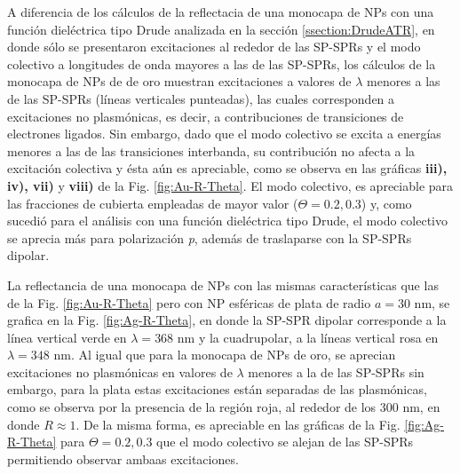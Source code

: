 A diferencia de los cálculos de la reflectacia de una monocapa de NPs  con una función dieléctrica tipo Drude analizada en la sección \ref{ssection:DrudeATR}, en donde sólo se presentaron excitaciones al rededor de las SP-SPRs y el modo colectivo a longitudes de onda mayores a las de las SP-SPRs, los cálculos de la monocapa de NPs de de oro muestran excitaciones a valores de $\lambda$ menores a las de las SP-SPRs (líneas verticales punteadas), las cuales corresponden a excitaciones no plasmónicas, es decir, a contribuciones de transiciones de electrones ligados. Sin embargo, dado que el modo colectivo se excita a energías menores a las de las transiciones interbanda, su contribución no afecta a la excitación colectiva y ésta aún es apreciable, como se observa en las gráficas \textbf{iii), iv), vii)} y \textbf{viii)} de la Fig. \ref{fig:Au-R-Theta}. El modo colectivo, es apreciable para las fracciones de cubierta empleadas de mayor valor ($\Theta = 0.2, 0.3$) y, como sucedió para el análisis con una función dieléctrica tipo Drude, el modo colectivo se aprecia más para polarización \emph{p}, además de traslaparse con la SP-SPRs dipolar.

La reflectancia de una monocapa de NPs con las mismas características que las de la Fig. \ref{fig:Au-R-Theta} pero con NP esféricas de plata de radio $a=30$ nm, se grafica en la Fig. \ref{fig:Ag-R-Theta}, en donde la SP-SPR dipolar corresponde a la línea vertical verde en $\lambda=368$ nm y la cuadrupolar, a la líneas vertical rosa en $\lambda=348$ nm. Al igual que para la monocapa de NPs de oro, se aprecian excitaciones no plasmónicas en valores de $\lambda$ menores a la de las SP-SPRs sin embargo, para la plata estas excitaciones están separadas de las plasmónicas, como se observa por la presencia de la región roja, al rededor de los $300$ nm,  en donde $R\approx 1$. De la misma forma, es apreciable en las gráficas de la Fig. \ref{fig:Ag-R-Theta} para $\Theta = 0.2, 0.3$ que  el modo colectivo se alejan de las SP-SPRs permitiendo observar ambaas excitaciones.

